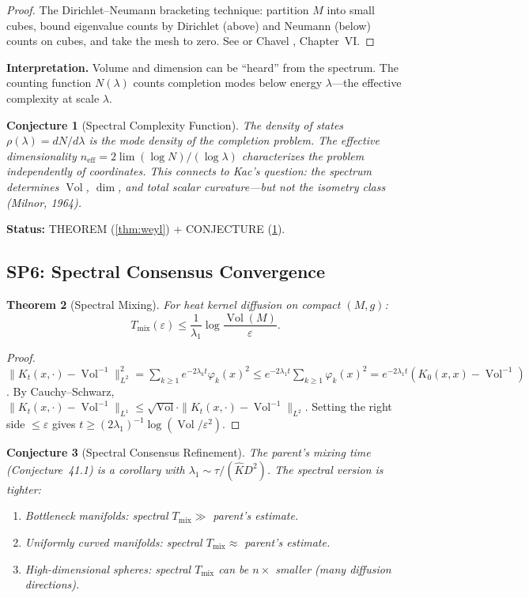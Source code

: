 \documentclass[11pt]{article}
\newtheorem{theorem}{Theorem}[section]
\newtheorem{conjecture}[theorem]{Conjecture}
\theoremstyle{definition}
\theoremstyle{remark}
\newcommand{\Vol}{\operatorname{Vol}}
\begin{document}
\begin{proof}
The Dirichlet--Neumann bracketing technique: partition $M$ into small cubes, bound eigenvalue counts by Dirichlet (above) and Neumann (below) counts on cubes, and take the mesh to zero. See \cite{Weyl} or Chavel \cite{Chavel}, Chapter~VI.
\end{proof}

\textbf{Interpretation.} Volume and dimension can be ``heard'' from the spectrum. The counting function $N(\lambda)$ counts completion modes below energy $\lambda$---the effective complexity at scale $\lambda$.

\begin{conjecture}[Spectral Complexity Function]\label{conj:weyl}
The density of states $\rho(\lambda) = dN/d\lambda$ is the mode density of the completion problem. The effective dimensionality $n_{\mathrm{eff}} = 2\lim(\log N)/(\log\lambda)$ characterizes the problem independently of coordinates. This connects to Kac's question: the spectrum determines $\Vol$, $\dim$, and total scalar curvature---but not the isometry class (Milnor, 1964).
\end{conjecture}

\textbf{Status:} THEOREM (\ref{thm:weyl}) + CONJECTURE (\ref{conj:weyl}).


\subsection{SP6: Spectral Consensus Convergence}

\begin{theorem}[Spectral Mixing]\label{thm:mix}
For heat kernel diffusion on compact $(M,g)$:
\[
T_{\mathrm{mix}}(\varepsilon) \le \frac{1}{\lambda_1}\log\frac{\Vol(M)}{\varepsilon}.
\]
\end{theorem}

\begin{proof}
$\|K_t(x, \cdot) - \Vol^{-1}\|_{L^2}^2 = \sum_{k \ge 1}e^{-2\lambda_k t}\varphi_k(x)^2 \le e^{-2\lambda_1 t}\sum_{k \ge 1}\varphi_k(x)^2 = e^{-2\lambda_1 t}(K_0(x,x) - \Vol^{-1})$. By Cauchy--Schwarz, $\|K_t(x,\cdot) - \Vol^{-1}\|_{L^1} \le \sqrt{\Vol}\cdot\|K_t(x,\cdot) - \Vol^{-1}\|_{L^2}$. Setting the right side $\le \varepsilon$ gives $t \ge (2\lambda_1)^{-1}\log(\Vol/\varepsilon^2)$.
\end{proof}

\begin{conjecture}[Spectral Consensus Refinement]\label{conj:consensus}
The parent's mixing time (Conjecture~41.1) is a corollary with $\lambda_1 \sim \tau/(\hat{K}D^2)$. The spectral version is tighter:
\begin{enumerate}[nosep, label=(\alph*)]
\item Bottleneck manifolds: spectral $T_{\mathrm{mix}} \gg$ parent's estimate.
\item Uniformly curved manifolds: spectral $T_{\mathrm{mix}} \approx$ parent's estimate.
\item High-dimensional spheres: spectral $T_{\mathrm{mix}}$ can be $n\times$ smaller (many diffusion directions).
\end{enumerate}
\end{conjecture}
\end{document}
